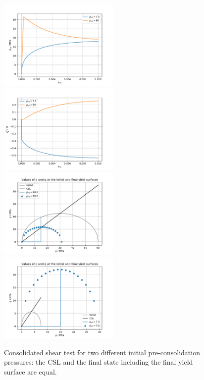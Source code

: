 \documentclass[paper=a4, twoside, pagesize]{scrartcl}
\begin{document}
\begin{figure}[h!]
  \vspace{-6mm}
  \includegraphics[width=0.52\textwidth]{img/SemiExplicitModifiedCamClay_OpenGeoSys2023/ModCamClay_ParamStudy_ShearCurves_pcStudy}
  \includegraphics[width=0.52\textwidth]{img/SemiExplicitModifiedCamClay_OpenGeoSys2023/ModCamClay_ParamStudy_eplVCurves_pcStudy}
  \includegraphics[width=0.52\textwidth]{img/SemiExplicitModifiedCamClay_OpenGeoSys2023/ModCamClay_ParamStudy_YieldSurface_pcHigh}
  \includegraphics[width=0.52\textwidth]{img/SemiExplicitModifiedCamClay_OpenGeoSys2023/ModCamClay_ParamStudy_YieldSurface_pcLow}
  \caption{Consolidated shear test for two different initial pre-consolidation pressures: the CSL and the final state including the final yield surface are equal.}\label{fig:mtestShear2cases}
\end{figure}
\end{document}
